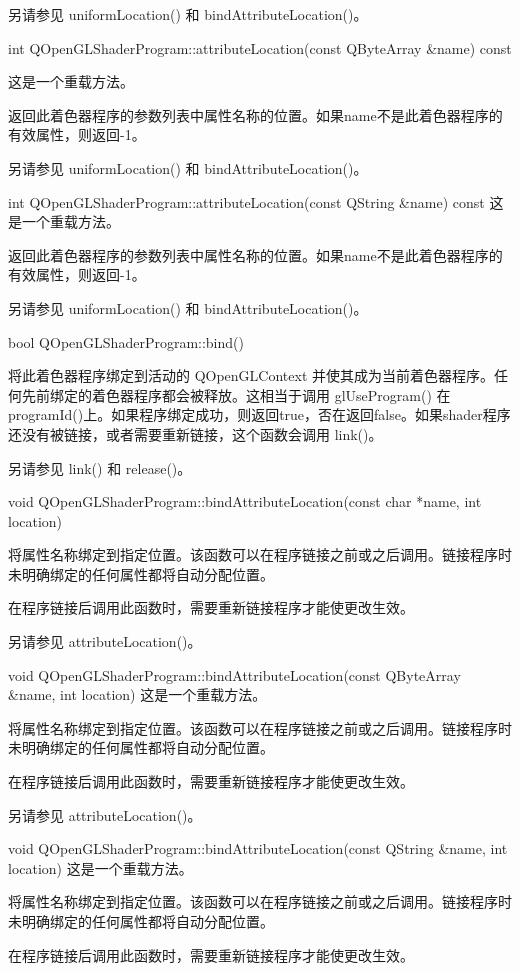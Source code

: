 另请参见 uniformLocation() 和 bindAttributeLocation()。

int QOpenGLShaderProgram::attributeLocation(const QByteArray \&name) const

这是一个重载方法。

返回此着色器程序的参数列表中属性名称的位置。如果name不是此着色器程序的有效属性，则返回-1。

另请参见 uniformLocation() 和 bindAttributeLocation()。

int QOpenGLShaderProgram::attributeLocation(const QString \&name) const
这是一个重载方法。

返回此着色器程序的参数列表中属性名称的位置。如果name不是此着色器程序的有效属性，则返回-1。

另请参见 uniformLocation() 和 bindAttributeLocation()。

bool QOpenGLShaderProgram::bind()

将此着色器程序绑定到活动的 QOpenGLContext 并使其成为当前着色器程序。任何先前绑定的着色器程序都会被释放。这相当于调用 glUseProgram() 在 programId()上。如果程序绑定成功，则返回true，否在返回false。如果shader程序还没有被链接，或者需要重新链接，这个函数会调用 link()。

另请参见 link() 和 release()。

void QOpenGLShaderProgram::bindAttributeLocation(const char *name, int location)

将属性名称绑定到指定位置。该函数可以在程序链接之前或之后调用。链接程序时未明确绑定的任何属性都将自动分配位置。

在程序链接后调用此函数时，需要重新链接程序才能使更改生效。

另请参见 attributeLocation()。

void QOpenGLShaderProgram::bindAttributeLocation(const QByteArray \&name, int location)
这是一个重载方法。

将属性名称绑定到指定位置。该函数可以在程序链接之前或之后调用。链接程序时未明确绑定的任何属性都将自动分配位置。

在程序链接后调用此函数时，需要重新链接程序才能使更改生效。

另请参见 attributeLocation()。

void QOpenGLShaderProgram::bindAttributeLocation(const QString \&name, int location)
这是一个重载方法。

将属性名称绑定到指定位置。该函数可以在程序链接之前或之后调用。链接程序时未明确绑定的任何属性都将自动分配位置。

在程序链接后调用此函数时，需要重新链接程序才能使更改生效。

